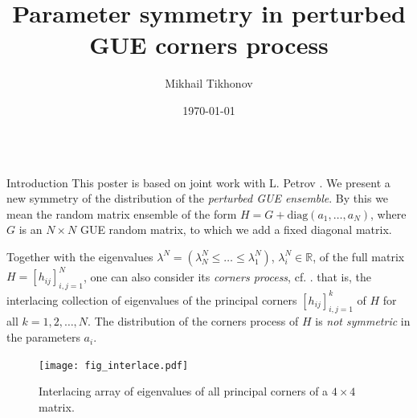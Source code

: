 \documentclass[english,final,t]{beamer}
\title{\huge Parameter symmetry in perturbed GUE corners process}
\author[Tikhonov]{Mikhail Tikhonov}
\institute[University of Virginia, IITP]{Department of Mathematics, University of Virginia and Institute for Information Transmission Problems}
\date{\today}
\begin{document}
\begin{frame}{}
    \begin{columns}[t]
        \begin{column}{.26\linewidth}

            \begin{block}{Introduction}
\justifying
This poster is based on joint work with L. Petrov \cite{PetrovTikhonov2020}.
We present a new symmetry
of the distribution of the \emph{perturbed GUE
ensemble}. By this we mean the random matrix ensemble
of the form $H=G+\mathrm{diag}(a_1,\ldots,a_N)$, where $G$ is an $N\times N$
GUE random matrix, to which we add a fixed diagonal matrix. 


Together with the eigenvalues $\lambda^N=(\lambda^N_N\le \ldots\le\lambda^N_1 )$,
$\lambda^N_i\in \mathbb{R}$,
of the full matrix $H=[h_{ij}]_{i,j=1}^{N}$, 
one can also
consider its
\emph{corners process},
cf. \cite{johansson2006eigenvalues}.
that is, the interlacing collection of eigenvalues
of the principal corners
$[h_{ij}]_{i,j=1}^{k}$ of $H$ for all $k=1,2,\ldots,N $.
The distribution of the corners process of $H$ is 
\emph{not symmetric} in the parameters $a_i$.

\begin{figure}[htpb]
	\centering
	\texttt{[image: fig\_interlace.pdf]}
	\caption{Interlacing array of eigenvalues
	of all principal corners of a $4\times 4$ matrix.}
	\label{fig:interlace}
\end{figure}


\end{block}
\end{column}
\end{columns}
\end{frame}
\end{document}
